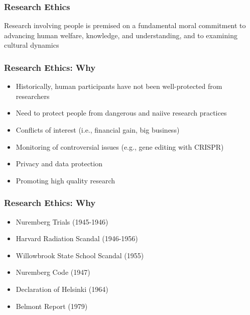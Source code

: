 \begin{frame}
	\frametitle{Research Ethics}
	
	Research involving people is premised on a fundamental moral commitment 
	to advancing human welfare, 
	knowledge, and understanding, and to examining cultural dynamics

\end{frame}

\begin{frame}
	\frametitle{Research Ethics: Why}
	
	\begin{itemize}
		\item Historically, human participants have not been well-protected from researchers
		\item Need to protect people from dangerous and naiive research practices
		\item Conflicts of interest (i.e., financial gain, big business)
		\item Monitoring of controversial issues (e.g., gene editing with CRISPR)
		\item Privacy and data protection
		\item Promoting high quality research
	\end{itemize}
\end{frame}

\begin{frame}
	\frametitle{Research Ethics: Why}
	
	\begin{itemize}
		\item Nuremberg Trials (1945-1946)
		\item Harvard Radiation Scandal (1946-1956)
		\item Willowbrook State School Scandal (1955)
		
	\end{itemize}
	
	\vspace{2em}
	
	\begin{itemize}
		\item Nuremberg Code (1947)
		\item Declaration of Helsinki (1964)
		\item Belmont Report (1979)
	\end{itemize}
\end{frame}

